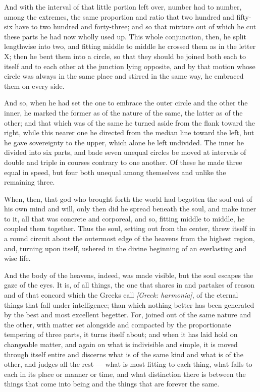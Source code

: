  And with the interval of that little portion left over, number had to number, among the extremes, the same proportion and ratio that two hundred and fifty-six have to two hundred and forty-three; and so that mixture out of which he cut these parts he had now wholly used up. This whole conjunction, then, he split lengthwise into two, and fitting middle to middle he crossed them as in the letter X; then he bent them into a circle, so that they should be joined both each to itself and to each other at the junction lying opposite, and by that motion whose circle was always in the same place and stirred in the same way, he embraced them on every side.

 And so, when he had set the one to embrace the outer circle and the other the inner, he marked the former as of the nature of the same, the latter as of the other; and that which was of the same he turned aside from the flank toward the right, while this nearer one he directed from the median line toward the left, but he gave sovereignty to the upper, which alone he left undivided. The inner he divided into six parts, and bade seven unequal circles be moved at intervals of double and triple in courses contrary to one another. Of these he made three equal in speed, but four both unequal among themselves and unlike the remaining three.

 When, then, that god who brought forth the world had begotten the soul out of his own mind and will, only then did he spread beneath the soul, and make inner to it, all that was concrete and corporeal, and so, fitting middle to middle, he coupled them together. Thus the soul, setting out from the center, threw itself in a round circuit about the outermost edge of the heavens from the highest region, and, turning upon itself, ushered in the divine beginning of an everlasting and wise life.

 And the body of the heavens, indeed, was made visible, but the soul escapes the gaze of the eyes. It is, of all things, the one that shares in and partakes of reason and of that concord which the Greeks call \textit{[Greek: harmonia]}, of the eternal things that fall under intelligence; than which nothing better has been generated by the best and most excellent begetter. For, joined out of the same nature and the other, with matter set alongside and compacted by the proportionate tempering of three parts, it turns itself about; and when it has laid hold on changeable matter, and again on what is indivisible and simple, it is moved through itself entire and discerns what is of the same kind and what is of the other, and judges all the rest — what is most fitting to each thing, what falls to each in its place or manner or time, and what distinction there is between the things that come into being and the things that are forever the same.

